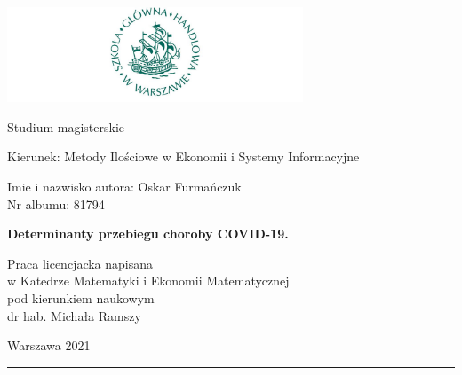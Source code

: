 \documentclass[polish, twoside, 12pt, a4paper]{article}
\theoremstyle{definition}
\theoremstyle{plain}
\theoremstyle{remark}
\begin{document}
\begin{titlepage}
\centering

\includegraphics[width=0.66\textwidth]{logo.JPG}

\vspace*{0.5cm}
Studium magisterskie\\
\begin{flushleft}
Kierunek: Metody Ilościowe w Ekonomii i Systemy Informacyjne\\
\end{flushleft}

\vspace*{.5cm}
\rule{0cm}{1cm}\hfill
\begin{minipage}{9cm}
Imie i nazwisko autora: Oskar Furmańczuk\\
Nr albumu: 81794
\end{minipage}

\vspace*{1cm}
\begin{minipage}{12cm}
\centering
\Large
\textbf{Determinanty przebiegu choroby COVID-19.}
\end{minipage}

\vspace*{2cm}
\rule{0cm}{1cm}\hfill
\begin{minipage}{9cm}
Praca licencjacka napisana\\
w Katedrze Matematyki i Ekonomii Matematycznej\\
pod kierunkiem naukowym\\
dr hab. Michała Ramszy
\end{minipage}

\vfill
Warszawa 2021
\end{titlepage}

\rule{1ex}{0ex}\clearpage

\graphicspath{ {./images/} }
\cleardoublepage
\tableofcontents

\cleardoublepage
\end{document}
